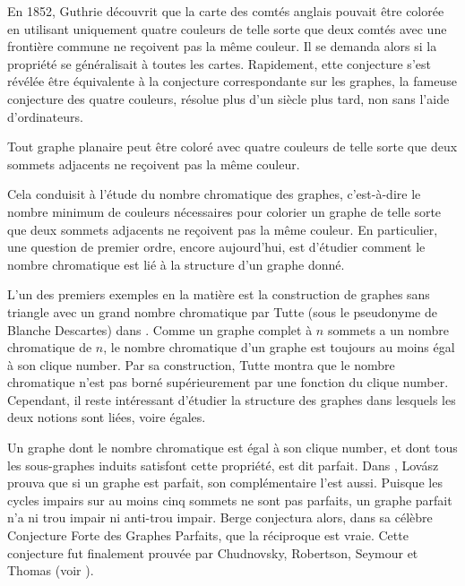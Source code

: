 \medskip

En 1852, Guthrie découvrit que la carte des comtés anglais pouvait être colorée en utilisant uniquement quatre couleurs de telle sorte que deux comtés avec une frontière commune ne reçoivent pas la même couleur. Il se demanda alors si la propriété se généralisait à toutes les cartes. Rapidement, ette conjecture s'est révélée être équivalente à la conjecture correspondante sur les graphes, la fameuse conjecture des quatre couleurs, résolue plus d'un siècle plus tard, non sans l'aide d'ordinateurs.

\begin{theoreme}\label{thm:four_colours_fr}

Tout graphe planaire peut être coloré avec quatre couleurs de telle sorte que deux sommets adjacents ne reçoivent pas la même couleur.

\end{theoreme}

Cela conduisit à l'étude du nombre chromatique des graphes, c'est-à-dire le nombre minimum de couleurs nécessaires pour colorier un graphe de telle sorte que deux sommets adjacents ne reçoivent pas la même couleur. En particulier, une question de premier ordre, encore aujourd'hui, est d'étudier comment le nombre chromatique est lié à la structure d'un graphe donné.

\medskip

L'un des premiers exemples en la matière est la construction de graphes sans triangle avec un grand nombre chromatique par Tutte (sous le pseudonyme de Blanche Descartes) dans \cite{D54}. Comme un graphe complet à $n$ sommets a un nombre chromatique de $n$, le nombre chromatique d'un graphe est toujours au moins égal à son clique number. Par sa construction, Tutte montra que le nombre chromatique n'est pas borné supérieurement par une fonction du clique number. Cependant, il reste intéressant d'étudier la structure des graphes dans lesquels les deux notions sont liées, voire égales.

\smallskip
Un graphe dont le nombre chromatique est égal à son clique number, et dont tous les sous-graphes induits satisfont cette propriété, est dit parfait. Dans \cite{L72}, Lov\'asz prouva que si un graphe est parfait, son complémentaire l'est aussi. Puisque les cycles impairs sur au moins cinq sommets ne sont pas parfaits, un graphe parfait n'a ni trou impair ni anti-trou impair. Berge conjectura alors, dans sa célèbre Conjecture Forte des Graphes Parfaits, que la réciproque est vraie. Cette conjecture fut finalement prouvée par Chudnovsky, Robertson, Seymour et Thomas (voir \cite{Perfect}).

